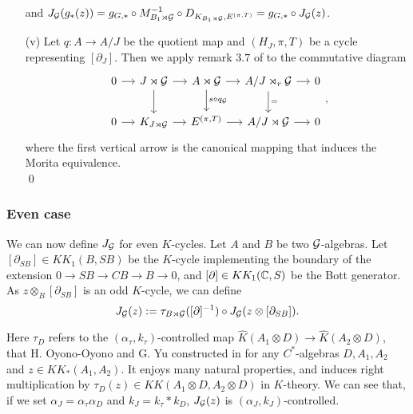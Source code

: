 \begin{dem}
\begin{enumerate}
and $J_\mathcal G(g_*(z))= g_{G,*}\circ M_{B_1\rtimes\mathcal G}^{-1}\circ D_{K_{B_1\rtimes \mathcal G},E^{(\pi,T)}}=g_{G,*}\circ J_\mathcal G(z)$.\\
\item[(v)] Let $q:A\rightarrow A/J$ be the quotient map and $(H_J, \pi, T)$ be a cycle representing $[\partial_J]$. Then we apply remark $3.7$ of \cite{OY2} to the commutative diagram
\[\begin{tikzcd}[column sep = small]
0\arrow{r} & J\rtimes \G\arrow{r}\arrow{d} & A\rtimes \G \arrow{r}\arrow{d}{s\circ q_\G}& A/J\rtimes_r \G\arrow{r}\arrow{d}{=} & 0\\
0\arrow{r} & K_{J\rtimes \G}\arrow{r} & E^{(\pi,T)} \arrow{r}& A/J\rtimes \G\arrow{r} & 0
\end{tikzcd},\]
where the first vertical arrow is the canonical mapping that induces the Morita equivalence. \\
\qed
\end{enumerate}
\end{dem}

\subsubsection{Even case}

We can now define $J_\mathcal G$ for even $K$-cycles. Let $A$ and $B$ be two $\mathcal G$-algebras. Let $[\partial_{SB}]\in KK_1(B,SB)$ be the $K$-cycle implementing the boundary of the extension $0\rightarrow SB\rightarrow CB\rightarrow B\rightarrow 0$, and $[\partial]\in KK_1(\mathbb C,S)$ be the Bott generator. As $z\otimes_B [\partial_{SB}]$ is an odd $K$-cycle, we can define
\[J_\mathcal G(z):= \tau_{B\rtimes \mathcal G}([\partial]^{-1})\circ J_\mathcal G(z\otimes[\partial_{SB}]).\] 

Here $\tau_D$ refers to the $(\alpha_\tau,k_\tau)$-controlled map $\hat K (A_1\otimes D )\rightarrow \hat K(A_2\otimes D)$, that H. Oyono-Oyono and G. Yu constructed in \cite{OY2} for any $C^*$-algebras $D,A_1,A_2$ and $z\in KK_*(A_1,A_2)$. It enjoys many natural properties, and induces right multiplication by $\tau_D(z)\in KK(A_1\otimes D,A_2\otimes D)$ in $K$-theory. We can see that, if we set $\alpha_J=\alpha_\tau \alpha_D$ and $k_J=k_\tau * k_D$, $J_\mathcal G(z)$ is $(\alpha_J,k_J)$-controlled.\\

